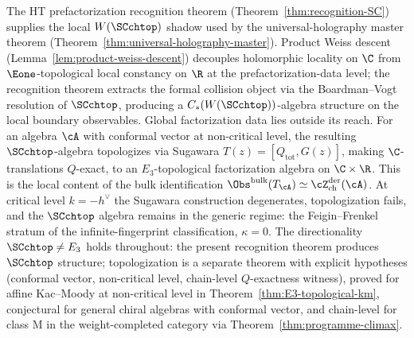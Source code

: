 \begin{remark}
\label{rem:locality-holography-anchor}%
%
The HT prefactorization recognition theorem
(Theorem~\ref{thm:recognition-SC}) supplies the local
$W(\SCchtop)$ shadow used by the universal-holography master theorem
(Theorem~\ref{thm:universal-holography-master}). Product Weiss
descent (Lemma~\ref{lem:product-weiss-descent}) decouples
holomorphic locality on $\C$ from $\Eone$-topological local
constancy on $\R$ at the prefactorization-data level; the
recognition theorem extracts the formal collision object via the
Boardman--Vogt resolution of $\SCchtop$, producing a
$C_*(W(\SCchtop))$-algebra structure on the local boundary
observables. Global factorization data lies outside its reach.
For an algebra $\cA$ with conformal vector at non-critical level,
the resulting $\SCchtop$-algebra topologizes via Sugawara
$T(z) = [Q_{\mathrm{tot}}, G(z)]$, making $\C$-translations
$Q$-exact, to an $E_3$-topological factorization algebra on
$\C \times \R$. This is the local content of the bulk
identification
$\Obs^{\mathrm{bulk}}(T_\cA) \simeq \cZ^{\mathrm{der}}_{\mathrm{ch}}(\cA)$.
At critical level $k = -h^\vee$ the Sugawara construction
degenerates, topologization fails, and the $\SCchtop$ algebra
remains in the generic regime: the Feigin--Frenkel stratum of the
infinite-fingerprint classification, $\kappa = 0$.
The directionality $\SCchtop \neq E_3$ holds throughout: the
present recognition theorem produces $\SCchtop$ structure;
topologization is a separate theorem with explicit hypotheses
(conformal vector, non-critical level, chain-level $Q$-exactness
witness), proved for affine Kac--Moody at non-critical level in
Theorem~\ref{thm:E3-topological-km}, conjectural for general
chiral algebras with conformal vector, and chain-level for class
M in the weight-completed category via
Theorem~\ref{thm:programme-climax}.
\end{remark}
